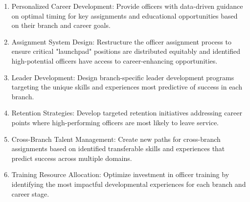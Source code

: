 \documentclass{article}
\begin{document}
\begin{enumerate}
\item Personalized Career Development: Provide officers with data-driven guidance on optimal timing for key assignments and educational opportunities based on their branch and career goals.

\item Assignment System Design: Restructure the officer assignment process to ensure critical "launchpad" positions are distributed equitably and identified high-potential officers have access to career-enhancing opportunities.

\item Leader Development: Design branch-specific leader development programs targeting the unique skills and experiences most predictive of success in each branch.

\item Retention Strategies: Develop targeted retention initiatives addressing career points where high-performing officers are most likely to leave service.

\item Cross-Branch Talent Management: Create new paths for cross-branch assignments based on identified transferable skills and experiences that predict success across multiple domains.

\item Training Resource Allocation: Optimize investment in officer training by identifying the most impactful developmental experiences for each branch and career stage.
\end{enumerate}
\end{document}
